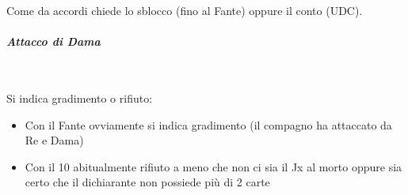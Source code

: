 \documentclass[a4paper,italian]{article}
\begin{document}
                                Come da accordi chiede lo sblocco (fino al Fante) oppure il conto (UDC).

                                \paragraph{\textit{Attacco di Dama}}\mbox{}\\
                                \vspace{-.4cm}

                                Si indica gradimento o rifiuto:
                                \begin{itemize}
                                    \item Con il Fante ovviamente si indica gradimento (il compagno ha
                                        attaccato da Re e Dama)
                                    \item Con il 10 abitualmente rifiuto a meno che non ci sia il Jx al morto oppure sia certo che il dichiarante non possiede più di 2 carte
                                \end{itemize}
                                \newpage
                                \setlength{\columnseprule}{1pt}
                                \def\columnseprulecolor{\color{black}}
\end{document}
